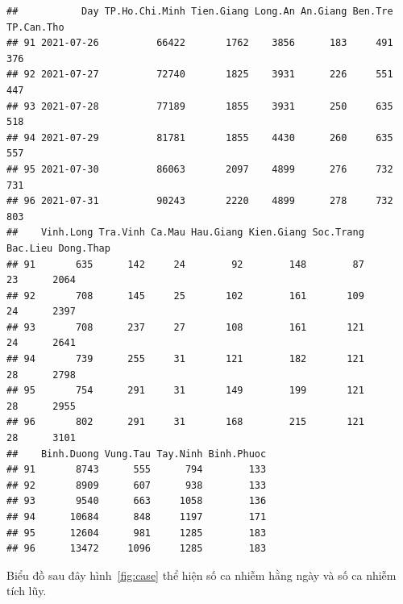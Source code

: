\documentclass[../thesis.tex]{subfiles}
\begin{document}
\begin{verbatim}
##           Day TP.Ho.Chi.Minh Tien.Giang Long.An An.Giang Ben.Tre TP.Can.Tho
## 91 2021-07-26          66422       1762    3856      183     491        376
## 92 2021-07-27          72740       1825    3931      226     551        447
## 93 2021-07-28          77189       1855    3931      250     635        518
## 94 2021-07-29          81781       1855    4430      260     635        557
## 95 2021-07-30          86063       2097    4899      276     732        731
## 96 2021-07-31          90243       2220    4899      278     732        803
##    Vinh.Long Tra.Vinh Ca.Mau Hau.Giang Kien.Giang Soc.Trang Bac.Lieu Dong.Thap
## 91       635      142     24        92        148        87       23      2064
## 92       708      145     25       102        161       109       24      2397
## 93       708      237     27       108        161       121       24      2641
## 94       739      255     31       121        182       121       28      2798
## 95       754      291     31       149        199       121       28      2955
## 96       802      291     31       168        215       121       28      3101
##    Binh.Duong Vung.Tau Tay.Ninh Binh.Phuoc
## 91       8743      555      794        133
## 92       8909      607      938        133
## 93       9540      663     1058        136
## 94      10684      848     1197        171
## 95      12604      981     1285        183
## 96      13472     1096     1285        183
\end{verbatim}



Biểu đồ sau đây hình~\ref{fig:case} thể hiện số ca nhiễm hằng ngày và số ca nhiễm tích lũy. 
\end{document}
